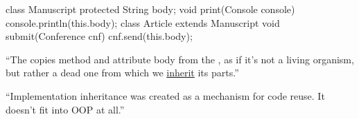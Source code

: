 \documentclass{article}
\begin{document}

\begin{multicols}{2}
{\small\begin{ffcode}
class Manuscript {
  protected String body;
  void print(Console console) {
    console.println(this.body);
  }
}
class Article
  extends Manuscript {
  void submit(Conference cnf) {
    cnf.send(this.body);
  }
}
\end{ffcode}
}
\par\columnbreak\par
\begin{spacing}{0.9}
``The  copies method  and attribute body from the , as if it’s not a living organism, but rather a dead one from which we \ul{inherit} its parts.''\par
``Implementation inheritance was created as a mechanism for code reuse. It doesn't fit into OOP at all.''\par
{}
\end{spacing}
\end{multicols}
\plush{}
\end{document}
